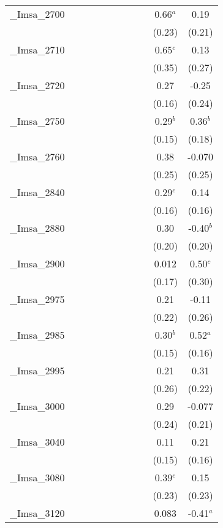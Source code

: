 \documentclass[]{article}
\begin{document}
\begin{tabular}{lcccccccccc}
\_Imsa\_2700 &  &  &  &  &  &  &  &  & 0.66$^a$ & 0.19 \\
 &  &  &  &  &  &  &  &  & (0.23) & (0.21) \\
\_Imsa\_2710 &  &  &  &  &  &  &  &  & 0.65$^c$ & 0.13 \\
 &  &  &  &  &  &  &  &  & (0.35) & (0.27) \\
\_Imsa\_2720 &  &  &  &  &  &  &  &  & 0.27 & -0.25 \\
 &  &  &  &  &  &  &  &  & (0.16) & (0.24) \\
\_Imsa\_2750 &  &  &  &  &  &  &  &  & 0.29$^b$ & 0.36$^b$ \\
 &  &  &  &  &  &  &  &  & (0.15) & (0.18) \\
\_Imsa\_2760 &  &  &  &  &  &  &  &  & 0.38 & -0.070 \\
 &  &  &  &  &  &  &  &  & (0.25) & (0.25) \\
\_Imsa\_2840 &  &  &  &  &  &  &  &  & 0.29$^c$ & 0.14 \\
 &  &  &  &  &  &  &  &  & (0.16) & (0.16) \\
\_Imsa\_2880 &  &  &  &  &  &  &  &  & 0.30 & -0.40$^b$ \\
 &  &  &  &  &  &  &  &  & (0.20) & (0.20) \\
\_Imsa\_2900 &  &  &  &  &  &  &  &  & 0.012 & 0.50$^c$ \\
 &  &  &  &  &  &  &  &  & (0.17) & (0.30) \\
\_Imsa\_2975 &  &  &  &  &  &  &  &  & 0.21 & -0.11 \\
 &  &  &  &  &  &  &  &  & (0.22) & (0.26) \\
\_Imsa\_2985 &  &  &  &  &  &  &  &  & 0.30$^b$ & 0.52$^a$ \\
 &  &  &  &  &  &  &  &  & (0.15) & (0.16) \\
\_Imsa\_2995 &  &  &  &  &  &  &  &  & 0.21 & 0.31 \\
 &  &  &  &  &  &  &  &  & (0.26) & (0.22) \\
\_Imsa\_3000 &  &  &  &  &  &  &  &  & 0.29 & -0.077 \\
 &  &  &  &  &  &  &  &  & (0.24) & (0.21) \\
\_Imsa\_3040 &  &  &  &  &  &  &  &  & 0.11 & 0.21 \\
 &  &  &  &  &  &  &  &  & (0.15) & (0.16) \\
\_Imsa\_3080 &  &  &  &  &  &  &  &  & 0.39$^c$ & 0.15 \\
 &  &  &  &  &  &  &  &  & (0.23) & (0.23) \\
\_Imsa\_3120 &  &  &  &  &  &  &  &  & 0.083 & -0.41$^a$ \\

\end{tabular}
\end{document}
